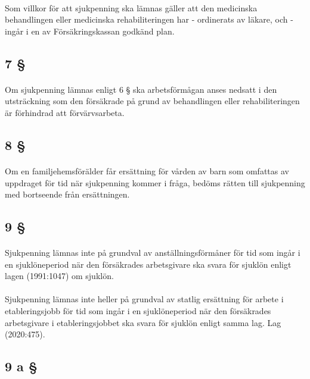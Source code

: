 \documentclass[a4paper,notitlepage,openany,10pt]{book}
\begin{document}
\paragraph*{}
Som villkor för att sjukpenning ska lämnas gäller att den medicinska behandlingen eller medicinska rehabiliteringen har
\newline - ordinerats av läkare, och
\newline - ingår i en av Försäkringskassan godkänd plan.
\subsection*{7 §}
\paragraph*{}
Om sjukpenning lämnas enligt 6 § ska arbetsförmågan anses nedsatt i den utsträckning som den försäkrade på grund av behandlingen eller rehabiliteringen är förhindrad att förvärvsarbeta.
\subsection*{8 §}
\paragraph*{}
Om en familjehemsförälder får ersättning för vården av barn som omfattas av uppdraget för tid när sjukpenning kommer i fråga, bedöms rätten till sjukpenning med bortseende från ersättningen.
\subsection*{9 §}
\paragraph*{}
Sjukpenning lämnas inte på grundval av anställningsförmåner för tid som ingår i en sjuklöneperiod när den försäkrades arbetsgivare ska svara för sjuklön enligt lagen (1991:1047) om sjuklön.
\paragraph*{}
Sjukpenning lämnas inte heller på grundval av statlig ersättning för arbete i etableringsjobb för tid som ingår i en sjuklöneperiod när den försäkrades arbetsgivare i etableringsjobbet ska svara för sjuklön enligt samma lag.
Lag (2020:475).
\subsection*{9 a §}
\end{document}
